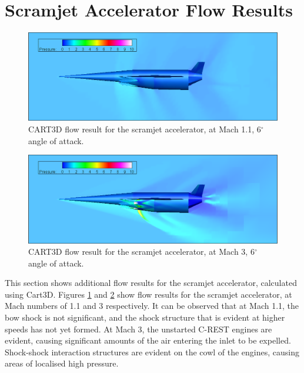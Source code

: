 \section{Scramjet Accelerator Flow Results}
\begin{figure}[ht]
	\centering
	\includegraphics[width=0.9\linewidth]{figures/3_vehicle_design/M1p1AoA6}
	\caption{CART3D flow result for the scramjet accelerator, at Mach 1.1, 6$^\circ$ angle of attack.}
	\label{fig:M1}
\end{figure}
\begin{figure}[ht]
	\centering
	\includegraphics[width=0.9\linewidth]{figures/3_vehicle_design/M3AoA6}
	\caption{CART3D flow result for the scramjet accelerator, at Mach 3, 6$^\circ$ angle of attack.}
	\label{fig:M3AoA6}
\end{figure}
This section shows additional flow results for the scramjet accelerator, calculated using Cart3D.
Figures \ref{fig:M1} and \ref{fig:M3AoA6} show flow results for the scramjet accelerator, at Mach numbers of 1.1 and 3 respectively. It can be observed that at Mach 1.1, the bow shock is not significant, and the shock structure that is evident at higher speeds has not yet formed. At Mach 3, the unstarted C-REST engines are evident, causing significant amounts of the air entering the inlet to be expelled. Shock-shock interaction structures are evident on the cowl of the engines, causing areas of localised high pressure.


\FloatBarrier
